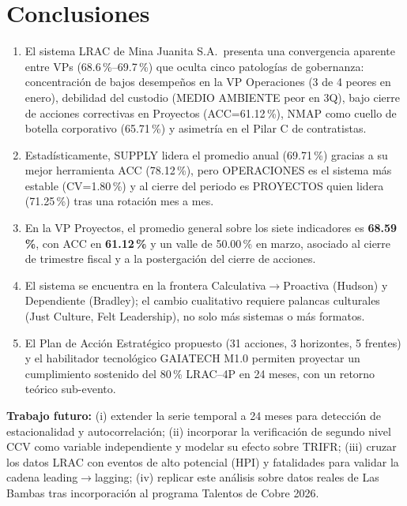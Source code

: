 \documentclass[12pt,a4paper]{article}
\begin{document}
\section{Conclusiones}

\begin{enumerate}
\item El sistema LRAC de Mina Juanita S.A.\ presenta una convergencia aparente entre VPs (68.6\,\%--69.7\,\%) que oculta cinco patologías de gobernanza: concentración de bajos desempeños en la VP Operaciones (3 de 4 peores en enero), debilidad del custodio (MEDIO AMBIENTE peor en 3Q), bajo cierre de acciones correctivas en Proyectos (ACC=61.12\,\%), NMAP como cuello de botella corporativo (65.71\,\%) y asimetría en el Pilar C de contratistas.
\item Estadísticamente, SUPPLY lidera el promedio anual (69.71\,\%) gracias a su mejor herramienta ACC (78.12\,\%), pero OPERACIONES es el sistema más estable (CV=1.80\,\%) y al cierre del periodo es PROYECTOS quien lidera (71.25\,\%) tras una rotación mes a mes.
\item En la VP Proyectos, el promedio general sobre los siete indicadores es \textbf{68.59\,\%}, con ACC en \textbf{61.12\,\%} y un valle de 50.00\,\% en marzo, asociado al cierre de trimestre fiscal y a la postergación del cierre de acciones.
\item El sistema se encuentra en la frontera Calculativa$\to$Proactiva (Hudson) y Dependiente (Bradley); el cambio cualitativo requiere palancas culturales (Just Culture, Felt Leadership), no solo más sistemas o más formatos.
\item El Plan de Acción Estratégico propuesto (31 acciones, 3 horizontes, 5 frentes) y el habilitador tecnológico GAIATECH M1.0 permiten proyectar un cumplimiento sostenido del 80\,\% LRAC--4P en 24 meses, con un retorno teórico sub-evento.
\end{enumerate}

\textbf{Trabajo futuro:} (i) extender la serie temporal a 24 meses para detección de estacionalidad y autocorrelación; (ii) incorporar la verificación de segundo nivel CCV como variable independiente y modelar su efecto sobre TRIFR; (iii) cruzar los datos LRAC con eventos de alto potencial (HPI) y fatalidades para validar la cadena leading$\to$lagging; (iv) replicar este análisis sobre datos reales de Las Bambas tras incorporación al programa Talentos de Cobre 2026.
\end{document}
